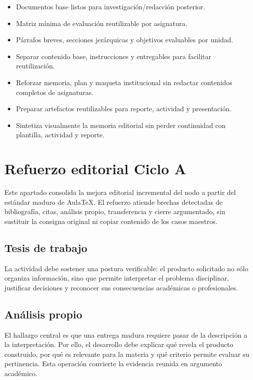 \documentclass[12pt]{article}
\begin{document}
\begin{itemize}[leftmargin=*]
  \item Documentos base listos para investigación/redacción posterior.
  \item Matriz mínima de evaluación reutilizable por asignatura.
  \item Párrafos breves, secciones jerárquicas y objetivos evaluables por unidad.
  \item Separar contenido base, instrucciones y entregables para facilitar reutilización.
  \item Reforzar memoria, plan y maqueta institucional sin redactar contenidos completos de asignaturas.
  \item Preparar artefactos reutilizables para reporte, actividad y presentación.
  \item Sintetiza visualmente la memoria editorial sin perder continuidad con plantilla, actividad y reporte.
\end{itemize}

\section*{Refuerzo editorial Ciclo A}
Este apartado consolida la mejora editorial incremental del nodo a partir del estándar maduro de AulaTeX. El refuerzo atiende brechas detectadas de bibliografía, citas, análisis propio, transferencia y cierre argumentado, sin sustituir la consigna original ni copiar contenido de los casos maestros.

\subsection*{Tesis de trabajo}
La actividad debe sostener una postura verificable: el producto solicitado no sólo organiza información, sino que permite interpretar el problema disciplinar, justificar decisiones y reconocer sus consecuencias académicas o profesionales.

\subsection*{Análisis propio}
El hallazgo central es que una entrega madura requiere pasar de la descripción a la interpretación. Por ello, el desarrollo debe explicar qué revela el producto construido, por qué es relevante para la materia y qué criterio permite evaluar su pertinencia. Esta operación convierte la evidencia reunida en argumento académico.
\end{document}
